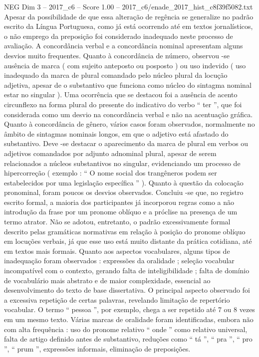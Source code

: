 \begin{textsample}{NEG Dim 3 – 2017\_c6 – Score 1.00 – 2017\_c6/enade\_2017\_hist\_c8f39f5082.txt}
Apesar da possibilidade de que essa alteração de regência se generalize no padrão escrito da Língua Portuguesa, como já está ocorrendo até em textos jornalísticos, o não emprego da preposição foi considerado inadequado neste processo de avaliação.
A concordância verbal e a concordância nominal apresentam alguns desvios muito frequentes.
Quanto à concordância de número, observou -se ausência de marca ( com sujeito anteposto ou posposto ) ou uso indevido ( uso inadequado da marca de plural comandado pelo núcleo plural da locução adjetiva, apesar de o substantivo que funciona como núcleo do sintagma nominal estar no singular ).
Uma ocorrência que se destacou foi a ausência de acento circunflexo na forma plural do presente do indicativo do verbo “ ter ”, que foi considerada como um desvio na concordância verbal e não na acentuação gráfica.
Quanto à concordância de gênero, vários casos foram observados, normalmente no âmbito de sintagmas nominais longos, em que o adjetivo está afastado do substantivo.
Deve -se destacar o aparecimento da marca de plural em verbos ou adjetivos comandados por adjunto adnominal plural, apesar de serem relacionados a núcleos substantivos no singular, evidenciando um processo de hipercorreção ( exemplo : “ O nome social dos trangêneros podem ser estabelecidos por uma legislação específica ” ).
Quanto à questão da colocação pronominal, foram poucos os desvios observados.
Concluiu -se que, no registro escrito formal, a maioria dos participantes já incorporou regras como a não introdução da frase por um pronome oblíquo e a próclise na presença de um termo atrator.
Não se adotou, entretanto, o padrão excessivamente formal descrito pelas gramáticas normativas em relação à posição do pronome oblíquo em locuções verbais, já que esse uso está muito distante da prática cotidiana, até em textos mais formais.
Quanto aos aspectos vocabulares, alguns tipos de inadequação foram observados : expressões da oralidade ; seleção vocabular incompatível com o contexto, gerando falta de inteligibilidade ; falta de domínio de vocabulário mais abstrato e de maior complexidade, essencial ao desenvolvimento do texto de base dissertativa.
O principal aspecto observado foi a excessiva repetição de certas palavras, revelando limitação de repertório vocabular.
O termo “ pessoa ”, por exemplo, chega a ser repetido até 7 ou 8 vezes em um mesmo texto.
Várias marcas de oralidade foram identificadas, embora não com alta frequência : uso do pronome relativo “ onde ” como relativo universal, falta de artigo definido antes de substantivo, reduções como “ tá ”, “ pra ”, “ pro ”, “ prum ”, expressões informais, eliminação de preposições.

\end{textsample}
